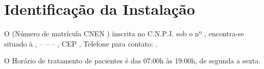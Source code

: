 \chapter{Identificação da Instalação}
O \instalacaoNOME (Número de matrícula CNEN \instalacaoMATRICULA) inscrita no C.N.P.J. sob o nº \instalacaoCNPJ, encontra-se situado à \instalacaoRUA, \instalacaoCOMPLEMENTO – \instalacaoBAIRRO – \instalacaoCIDADE – \instalacaoUF, CEP \instalacaoCEP, Telefone para contato: \instalacaoTELEFONE.

O Horário de tratamento de pacientes é das 07:00h às 19:00h, de segunda a sexta.